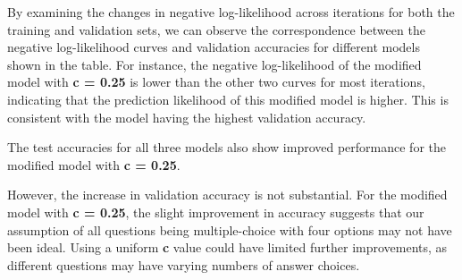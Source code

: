 \documentclass[letterpaper]{article}
\begin{document}


By examining the changes in negative log-likelihood across iterations for both the training and validation sets, we can
observe the correspondence between the negative log-likelihood curves and validation accuracies for different models
shown in the table. For instance, the negative log-likelihood of the modified model with \textbf{c = 0.25} is lower
than the other two curves for most iterations, indicating that the prediction likelihood of this modified model is
higher. This is consistent with the model having the highest validation accuracy.

The test accuracies for all three models also show improved performance for the modified model with \textbf{c = 0.25}. 


\bigskip





\bigskip

However, the increase in validation accuracy is not substantial. For the modified model with \textbf{c = 0.25}, the
slight improvement in accuracy suggests that our assumption of all questions being multiple-choice with four options
may not have been ideal. Using a uniform \textbf{c} value could have limited further improvements, as different
questions may have varying numbers of answer choices.
\end{document}
